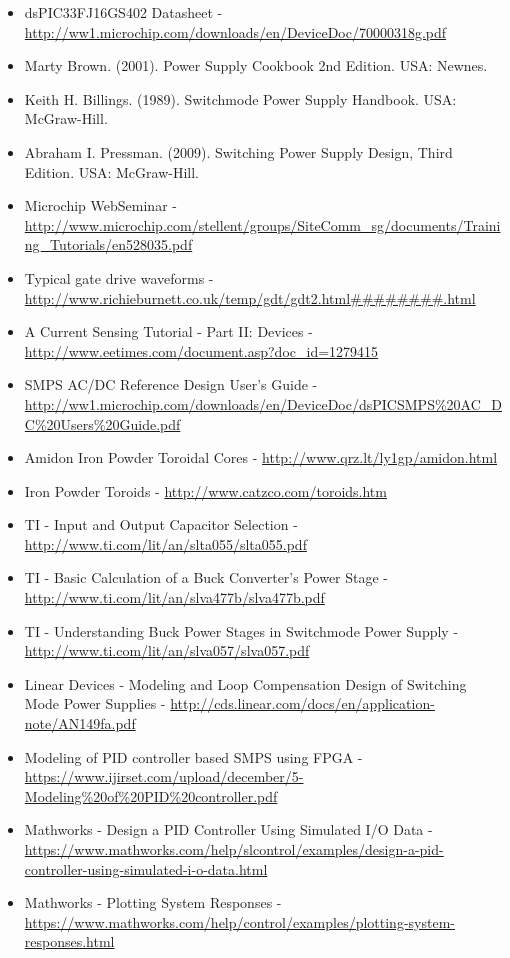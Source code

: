 \documentclass[12pt]{report}
\begin{document}
\begin{itemize}
	\item dsPIC33FJ16GS402 Datasheet - \url{http://ww1.microchip.com/downloads/en/DeviceDoc/70000318g.pdf}
	\item Marty Brown. (2001). Power Supply Cookbook 2nd Edition. USA: Newnes.
	\item Keith H. Billings. (1989). Switchmode Power Supply Handbook. USA: McGraw-Hill.
	\item Abraham I. Pressman. (2009). Switching Power Supply Design, Third Edition. USA: McGraw-Hill.
	\item Microchip WebSeminar - \url{http://www.microchip.com/stellent/groups/SiteComm_sg/documents/Training_Tutorials/en528035.pdf}
	\item Typical gate drive waveforms - \url{http://www.richieburnett.co.uk/temp/gdt/gdt2.html########.html}
	\item A Current Sensing Tutorial - Part II: Devices - \url{http://www.eetimes.com/document.asp?doc_id=1279415}
	\item SMPS AC/DC Reference Design User's Guide - \url{http://ww1.microchip.com/downloads/en/DeviceDoc/dsPICSMPS\%20AC_DC\%20Users\%20Guide.pdf}
	\item Amidon Iron Powder Toroidal Cores - \url{http://www.qrz.lt/ly1gp/amidon.html}
	\item Iron Powder Toroids - \url{http://www.catzco.com/toroids.htm}
	\item TI - Input and Output Capacitor Selection - \url{http://www.ti.com/lit/an/slta055/slta055.pdf}
	\item TI - Basic Calculation of a Buck Converter's Power Stage - \url{http://www.ti.com/lit/an/slva477b/slva477b.pdf}
	\item TI - Understanding Buck Power Stages in Switchmode Power Supply - \url{http://www.ti.com/lit/an/slva057/slva057.pdf}
	\item Linear Devices - Modeling and Loop Compensation Design of
	Switching Mode Power Supplies - \url{http://cds.linear.com/docs/en/application-note/AN149fa.pdf}
	\item Modeling of PID controller based SMPS using
	FPGA - \url{https://www.ijirset.com/upload/december/5-Modeling\%20of\%20PID\%20controller.pdf}
	\item Mathworks - Design a PID Controller Using Simulated I/O Data - \url{https://www.mathworks.com/help/slcontrol/examples/design-a-pid-controller-using-simulated-i-o-data.html}
	\item Mathworks - Plotting System Responses - \url{https://www.mathworks.com/help/control/examples/plotting-system-responses.html}

\end{itemize}
\end{document}

